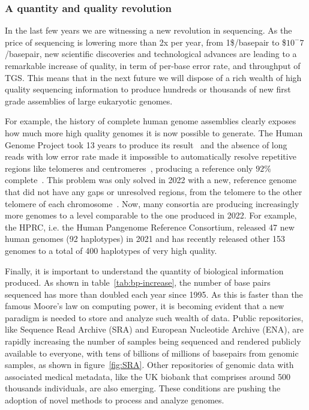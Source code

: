 \subsubsection{A quantity and quality revolution }
In the last few years we are witnessing a new revolution in sequencing. As the price of sequencing is lowering more than 2x per year, from 1\$/basepair to \$$10^-7$/basepair\cite{durbin_recomb}, new scientific discoveries and technological advances are leading to a remarkable increase of quality, in term of per-base error rate, and throughput of TGS. This means that in the next future we will dispose of a rich wealth of high quality sequencing information to produce hundreds or thousands of new first grade assemblies of large eukaryotic genomes. 


For example, the history of complete human genome assemblies clearly exposes how much more high quality genomes it is now possible to generate. The Human Genome Project took 13 years to produce its result~\cite{humangenomeproject} and the absence of long reads with low error rate made it impossible to automatically resolve repetitive regions like telomeres and centromeres~\cite{human-pangenomics-era}, producing a reference only $92\%$ complete~\cite{t2t}. This problem was only solved in 2022 with a new, reference genome that did not have any gaps or unresolved regions, from the telomere to the other telomere of each chromosome~\cite{t2t}. Now, many consortia are producing increasingly more genomes to a level comparable to the one produced in 2022. For example, the HPRC, i.e. the Human Pangenome Reference Consortium, released 47 new human genomes (92 haplotypes) in 2021 and has recently released other 153 genomes to a total of 400 haplotypes of very high quality.

Finally, it is important to understand the quantity of biological information produced. As shown in table~\ref{tab:bp-increase}, the number of base pairs sequenced has more than doubled each year since 1995. As this is faster than the famous Moore's law on computing power, it is becoming evident that a new paradigm is needed to store and analyze such wealth of data. Public repositories, like Sequence Read Archive (SRA) and European Nucleotide Archive (ENA), are rapidly increasing the number of samples being sequenced and rendered publicly available to everyone, with tens of billions of millions of basepairs from genomic samples, as shown in figure~\ref{fig:SRA}. Other repositories of genomic data with associated medical metadata, like the UK biobank that comprises around 500 thousands individuals, are also emerging. These conditions are pushing the adoption of novel methods to process and analyze genomes.

